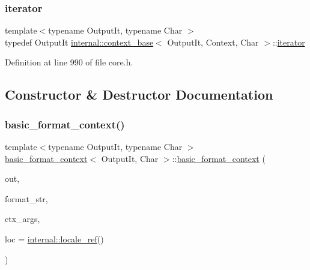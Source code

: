 \subsubsection{\texorpdfstring{iterator}{iterator}}
{\footnotesize\ttfamily template$<$typename Output\+It, typename Char $>$ \\
typedef Output\+It \hyperlink{classinternal_1_1context__base}{internal\+::context\+\_\+base}$<$ Output\+It, Context, Char $>$\+::\hyperlink{classbasic__format__context_a6486e3c9656c10eb99a4731fb169e51b}{iterator}}



Definition at line 990 of file core.\+h.



\subsection{Constructor \& Destructor Documentation}
\mbox{\label{classbasic__format__context_a0200f51bac08beeedbb96cbdafe060ec}} 
\subsubsection{\texorpdfstring{basic\+\_\+format\+\_\+context()}{basic\_format\_context()}}
{\footnotesize\ttfamily template$<$typename Output\+It, typename Char $>$ \\
\hyperlink{classbasic__format__context}{basic\+\_\+format\+\_\+context}$<$ Output\+It, Char $>$\+::\hyperlink{classbasic__format__context}{basic\+\_\+format\+\_\+context} (\begin{DoxyParamCaption}\item[{Output\+It}]{out,  }\item[{\hyperlink{classbasic__string__view}{basic\+\_\+string\+\_\+view}$<$ \hyperlink{classbasic__format__context_ab6b3447e996c0b8117e4f6d98d4e1597}{char\+\_\+type} $>$}]{format\+\_\+str,  }\item[{\hyperlink{classbasic__format__args}{basic\+\_\+format\+\_\+args}$<$ \hyperlink{classbasic__format__context}{basic\+\_\+format\+\_\+context}$<$ Output\+It, Char $>$ $>$}]{ctx\+\_\+args,  }\item[{\hyperlink{classinternal_1_1locale__ref}{internal\+::locale\+\_\+ref}}]{loc = {\ttfamily \hyperlink{classinternal_1_1locale__ref}{internal\+::locale\+\_\+ref}()} }\end{DoxyParamCaption})\hspace{0.3cm}{\ttfamily [inline]}}

